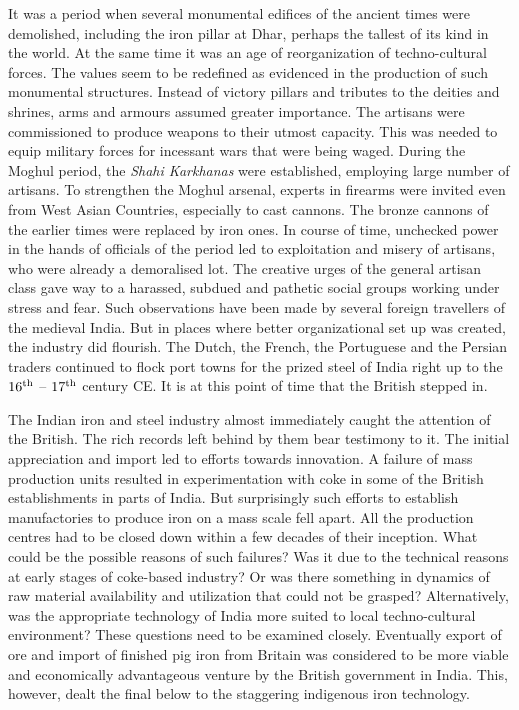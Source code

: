 It was a period when several monumental edifices of the ancient times were demolished, including the iron pillar at Dhar, perhaps the tallest of its kind in the world. At the same time it was an age of reorganization of techno-cultural forces. The values seem to be redefined as evidenced in the production of such monumental structures. Instead of victory pillars and tributes to the deities and shrines, arms and armours assumed greater importance. The artisans were commissioned to produce weapons to their utmost capacity. This was needed to equip military forces for incessant wars that were being waged. During the Moghul period, the \textit{Shahi Karkhanas} were established, employing large number of artisans. To strengthen the Moghul arsenal, experts in firearms were invited even from West Asian Countries, especially to cast cannons. The bronze cannons of the earlier times were replaced by iron ones. In course of time, unchecked power in the hands of officials of the period led to exploitation and misery of artisans, who were already a demoralised lot. The creative urges of the general artisan class gave way to a harassed, subdued and pathetic social groups working under stress and fear. Such observations have been made by several foreign travellers of the medieval India. But in places where better organizational set up was created, the industry did flourish. The Dutch, the French, the Portuguese and the Persian traders continued to flock port towns for the prized steel of India right up to the $16^{\rm th}$ – $17^{\rm th}$ century CE. It is at this point of time that the British stepped in.

The Indian iron and steel industry almost immediately caught the attention of the British. The rich records left behind by them bear testimony to it. The initial appreciation and import led to efforts towards innovation. A failure of mass production units resulted in experimentation with coke in some of the British establishments in parts of India. But surprisingly such efforts to establish manufactories to produce iron on a mass scale fell apart. All the production centres had to be closed down within a few decades of their inception. What could be the possible reasons of such failures? Was it due to the technical reasons at early stages of coke-based industry? Or was there something in dynamics of raw material availability and utilization that could not be grasped? Alternatively, was the appropriate technology of India more suited to local techno-cultural environment? These questions need to be examined closely. Eventually export of ore and import of finished pig iron from Britain was considered to be more viable and economically advantageous venture by the British government in India. This, however, dealt the final below to the staggering indigenous iron technology.

